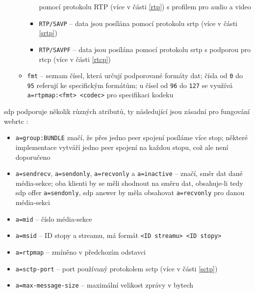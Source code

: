 \begin{itemize}
\begin{itemize}
\begin{itemize}
                              pomocí protokolu RTP (více v části \ref{rtp}) s
                              profilem pro audio a video
                        \item \texttt{RTP/SAVP} -- data jsou posílána
                              pomocí protokolu \gls{srtp} (více v části
                              \ref{srtp})
                        \item \texttt{RTP/SAVPF} -- data jsou posílána
                              pomocí protokolu \gls{srtp} s podporou pro
                              \gls{rtcp} (více v části \ref{rtcp})
                    \end{itemize}
              \item \texttt{fmt} -- seznam čísel, která určují
                    podporované formáty dat; čísla od \texttt{0} do
                    \texttt{95} referují ke specifickým formátům; u
                    čísel od \texttt{96} do \texttt{127} se
                    využívá \texttt{a=rtpmap:<fmt> <codec>} pro
                    specifikaci kodeku
          \end{itemize}
\end{itemize}

\gls{sdp} podporuje několik různých atributů, ty následující jsou zásadní pro
fungování \gls{webrtc}
\parencite{WebRTCForTheCurious,IETF-RFC8866,IETF-RFC5888,IETF-RFC8841}:
\begin{itemize}
    \item \texttt{a=group:BUNDLE} značí, že přes jedno peer spojení
          posíláme více stop; některé implementace vytváří jedno peer spojení na
          každou stopu, což ale není doporučeno
    \item \texttt{a=sendrecv}, \texttt{a=sendonly},
          \texttt{a=recvonly} a \texttt{a=inactive} --
          značí, směr dat dané média-sekce; oba klienti by se měli shodnout na
          směru dat, obsahuje-li tedy \gls{sdp} offer
          \texttt{a=sendonly}, \gls{sdp} answer by měla obsahovat
          \texttt{a=recvonly} pro danou média-sekci
    \item \texttt{a=mid} -- číslo média-sekce
    \item \texttt{a=msid} -- ID stopy a streamu, má formát
          \texttt{<ID streamu> <ID stopy>}
    \item \texttt{a=rtpmap} -- zmíněno v předchozím odstavci
    \item \texttt{a=sctp-port} -- port používaný protokolem \gls{sctp}
          (více v části \ref{sctp})
    \item \texttt{a=max-message-size} -- maximální velikost zprávy v
          bytech
\end{itemize}

